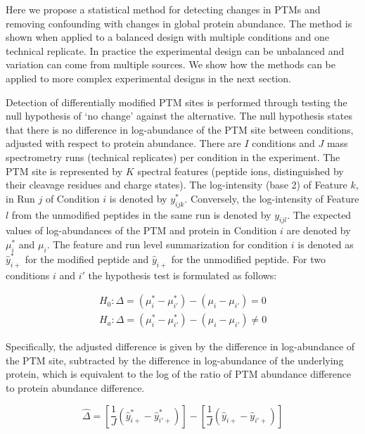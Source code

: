 \documentclass[mcp]{article}
\numberwithin{table}{section}
\begin{document}
Here we propose a statistical method for detecting changes in PTMs and removing confounding with changes in global protein abundance. The method is shown when applied to a balanced design with multiple conditions and one technical replicate. In practice the experimental design can be unbalanced and variation can come from multiple sources. We show how the methods can be applied to more complex experimental designs in the next section.

Detection of differentially modified PTM sites is performed through testing the null hypothesis of ‘no change’ against the alternative. The null hypothesis states that there is no difference in log-abundance of the PTM site between conditions, adjusted with respect to protein abundance. There are $I$ conditions and $J$ mass spectrometry runs (technical replicates) per condition in the experiment. The PTM site is represented by $K$ spectral features (peptide ions, distinguished by their cleavage residues and charge states). The log-intensity (base 2) of Feature $k$, in Run $j$ of Condition $i$ is denoted by $y_{ijk}^{\ast}$. Conversely, the log-intensity of Feature $l$ from the unmodified peptides in the same run is denoted by $y_{ijl}$. The expected values of log-abundances of the PTM and protein in Condition $i$ are denoted by $\mu_{i}^{\ast}$ and $\mu_{i}$. The feature and run level summarization for condition $i$ is denoted as $\hat{y}_{i+}^{\ast}$ for the modified peptide and $\hat{y}_{i+}$ for the unmodified peptide. For two conditions $i$ and $i'$ the hypothesis test is formulated as follows:

\begin{equation}
\begin{aligned}
H_{0}: \Delta = ( \mu_{i}^{\ast} - \mu_{i'}^{\ast} ) - ( \mu_{i} - \mu_{i'} ) = 0 \\
H_{a}: \Delta = ( \mu_{i}^{\ast} - \mu_{i'}^{\ast} ) - ( \mu_{i} - \mu_{i'} ) \neq 0
\end{aligned}
\label{eq_1}
\end{equation}

Specifically, the adjusted difference is given by the difference in log-abundance of the PTM site, subtracted by the difference in log-abundance of the underlying protein, which is equivalent to the log of the ratio of PTM abundance difference to protein abundance difference. 

\begin{equation}
\hat{\Delta} = \left[ \frac{1}{J} \left( \hat{y}_{i+}^{\ast} - \hat{y}_{i'+}^{\ast} \right) \right] - \left[ \frac{1}{J} \left( \hat{y}_{i+} - \hat{y}_{i'+} \right) \right]
\end{equation}
\end{document}
